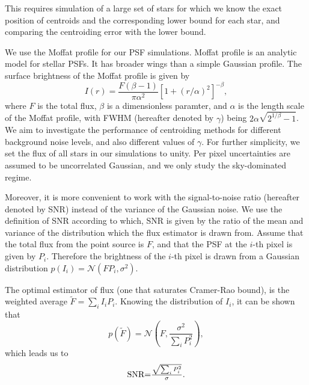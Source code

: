 \documentclass[12pt, preprint]{aastex}
\newcommand{\beq}{\begin{equation}}
\newcommand{\eeq}{\end{equation}}
\begin{document}
This requires simulation of a large set of stars for which we know the exact position of centroids
and the corresponding lower bound for each star, and comparing the centroiding error with the lower bound.




We use the Moffat profile \citep{moffat} for our PSF simulations. 
Moffat profile is an analytic model for stellar PSFs. It has broader wings than
a simple Gaussian profile. The surface brightness of the Moffat profile is given by
\beq
I(r) = \frac{F(\beta -1)}{\pi \alpha^{2}}[1+(r/\alpha)^{2}]^{-\beta},
\label{mof}
\eeq
where $F$ is the total flux, $\beta$ is a dimensionless paramter, and $\alpha$ is
the length scale of the Moffat profile, with FWHM (hereafter denoted by $\gamma$)
being $2\alpha\sqrt{2^{1/\beta}-1}$. 
We aim to investigate the performance of centroiding methods for
 different background noise levels, and also different
values of $\gamma$. For further simplicity, we set the flux of all stars in our
simulations to unity. Per pixel uncertainties are assumed to be uncorrelated Gaussian,
and we only study the sky-dominated regime.

Moreover, it is more convenient to work with the signal-to-noise ratio
(hereafter denoted by SNR) instead of the variance of the Gaussian noise.
We use the definition of SNR according to which, SNR is given by the ratio
 of the mean and variance of the distribution
which the flux estimator is drawn from. Assume that the total flux from
the point source is $F$, and that the PSF at the $i$-th pixel is given
by $P_{i}$. Therefore the brightness of the $i$-th pixel is drawn from
a Gaussian distribution $p(I_{i}) = \mathcal{N}(FP_{i},\sigma^{2})$. 

The optimal estimator of flux (one that saturates Cramer-Rao bound),
is the weighted average $\tilde{F}=\sum_{i}I_{i}P_{i}$. Knowing the
distribution of $I_{i}$, it can be shown that 
\beq
p(\tilde{F}) = \mathcal{N}(F , \frac{\sigma^{2}}{\sum_{i}P_{i}^{2}}),
\eeq  
which leads us to
\beq
\begin{array}{l}
\text{SNR} $=$ \frac{\sqrt{\sum_{i} P_{i}^{2}}}{\sigma}.
\end{array}
\label{snr}
\eeq
\end{document}
